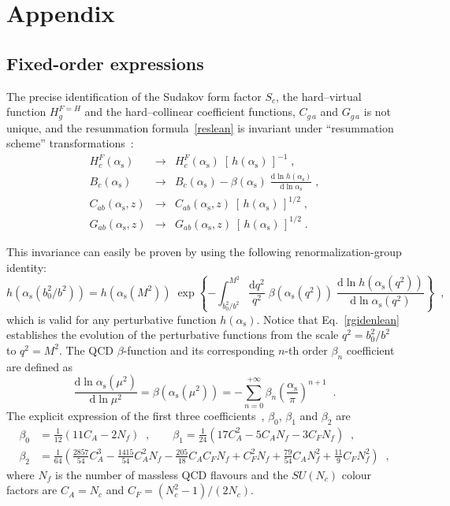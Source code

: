 \documentclass[12pt]{article}
\DeclareRobustCommand{\nn}{\nonumber}
\def\beeq{\begin{eqnarray}}
\def\eeeq{\end{eqnarray}}
\DeclareRobustCommand{\alphas}{\ensuremath{\alpha_{\mathrm{s}}}\xspace}
\DeclareRobustCommand{\as}{\alphas}
\DeclareRobustCommand{\rd}{\ensuremath{\mathrm{d}}}
\begin{document}
\section*{Appendix}
\begin{appendix}

\section{Fixed-order expressions}
\label{app:fixed-order}


The precise identification of the Sudakov form factor $S_c$, the hard--virtual function 
$H_g^{F=H}$ and the hard--collinear coefficient functions, $C_{g\, a}$ and $G_{g\, a}$ is not unique, and the resummation formula~\eqref{reslean} is invariant under ``resummation scheme''  transformations~\cite{Catani:2000vq}:
\beeq
H_c^{F}(\as) & \to & H_c^{F}(\as) \; \left[ \, h(\as) \, \right]^{-1}
\;, \nn \\
\label{restranf}
B_c(\as) & \to & B_c(\as) - \beta(\as) \;\frac{\rd\ln h(\as)}{\rd\ln \as} 
\;,\\
C_{ab}(\as,z) & \to & C_{ab}(\as,z) \;
\left[ \, h(\as) \, \right]^{1/2} \;,\nn\\
G_{ab}(\as,z) & \to & G_{ab}(\as,z) \;
\left[ \, h(\as) \, \right]^{1/2} \;. \nn
\eeeq

 This invariance can easily be proven by using the following renormalization-group identity:
\begin{equation}
\label{rgidenlean}
h(\as(b_0^2/b^2)) = h(\as(M^2)) \; \exp \left\{ 
-\int_{b_0^2/b^2}^{M^2} \frac{\rd q^2}{q^2} 
\;\beta(\as(q^2)) \;\frac{\rd \ln h(\as(q^2))}{\rd \ln \as(q^2)} 
\right\} \;\;,
\end{equation}
which is valid for any perturbative function $h(\as)$. Notice that Eq.~\eqref{rgidenlean} establishes the evolution of the perturbative functions from the scale $q^{2}=b_0^2/b^2$ to $q^{2}=M^2$. The QCD $\beta$-function and its corresponding $n$-th order $\beta_n$ coefficient are defined as
\begin{equation}
\label{rge}
\frac{\rd \ln \as(\mu^2)}{\rd \ln \mu^2} = \beta(\as(\mu^2)) = 
- \sum_{n=0}^{+\infty} \beta_n \left( \frac{\as}{\pi} \right)^{n+1}\;\;.
\end{equation}
The explicit expression of the first three coefficients~\cite{Tarasov:1980au,Larin:1993tp}, $\beta_0$, $\beta_1$ and
$\beta_2$ are
\begin{align}
\beta_0 &= \frac{1}{12} \left( 11 C_A - 2 N_f \right) \;\;,
\quad\quad \beta_1=  \frac{1}{24} 
\left( 17 C_A^2 - 5 C_A N_f - 3 C_F N_f \right) \;\;,\nn\\
\beta_2 &= \frac{1}{64} \left( \frac{2857}{54} C_A^3
- \frac{1415}{54} C_A^2 N_f - \frac{205}{18} C_A C_F N_f + C_F^2 N_f
+ \frac{79}{54} C_A N_f^2 + \frac{11}{9} C_F N_f^2 \right) \;\;,
\end{align}
where $N_f$ is the number of massless QCD flavours and the $SU(N_c)$ colour factors are $C_A=N_c$  and $C_F=(N_c^2-1)/(2N_c)$.




\end{appendix}
\end{document}
